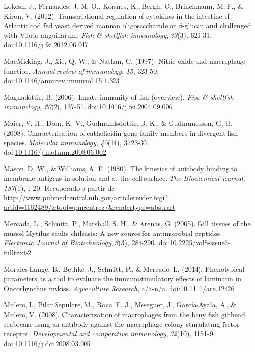 \documentclass[12pt,letterpaper,oneside]{scrbook}
\begin{document}
Lokesh, J., Fernandes, J. M. O., Korsnes, K., Bergh, O., Brinchmann, M.
F., \& Kiron, V. (2012). Transcriptional regulation of cytokines in the
intestine of Atlantic cod fed yeast derived mannan oligosaccharide or
\(\beta\)-glucan and challenged with Vibrio anguillarum. \emph{Fish \&
shellfish immunology}, \emph{33}(3), 626-31.
doi:\href{http://dx.doi.org/10.1016/j.fsi.2012.06.017}{10.1016/j.fsi.2012.06.017}

MacMicking, J., Xie, Q. W., \& Nathan, C. (1997). Nitric oxide and
macrophage function. \emph{Annual review of immunology}, \emph{15},
323-50.
doi:\href{http://dx.doi.org/10.1146/annurev.immunol.15.1.323}{10.1146/annurev.immunol.15.1.323}

Magnadóttir, B. (2006). Innate immunity of fish (overview). \emph{Fish
\& shellfish immunology}, \emph{20}(2), 137-51.
doi:\href{http://dx.doi.org/10.1016/j.fsi.2004.09.006}{10.1016/j.fsi.2004.09.006}

Maier, V. H., Dorn, K. V., Gudmundsdottir, B. K., \& Gudmundsson, G. H.
(2008). Characterisation of cathelicidin gene family members in
divergent fish species. \emph{Molecular immunology}, \emph{45}(14),
3723-30.
doi:\href{http://dx.doi.org/10.1016/j.molimm.2008.06.002}{10.1016/j.molimm.2008.06.002}

Mason, D. W., \& Williams, A. F. (1980). The kinetics of antibody
binding to membrane antigens in solution and at the cell surface.
\emph{The Biochemical journal}, \emph{187}(1), 1-20. Recuperado a partir
de
\url{http://www.pubmedcentral.nih.gov/articlerender.fcgi?artid=1162489/\&tool=pmcentrez/\&rendertype=abstract}

Mercado, L., Schmitt, P., Marshall, S. H., \& Arenas, G. (2005). Gill
tissues of the mussel Mytilus edulis chilensis: A new source for
antimicrobial peptides. \emph{Electronic Journal of Biotechnology},
\emph{8}(3), 284-290.
doi:\href{http://dx.doi.org/10.2225/vol8-issue3-fulltext-2}{10.2225/vol8-issue3-fulltext-2}

Morales-Lange, B., Bethke, J., Schmitt, P., \& Mercado, L. (2014).
Phenotypical parameters as a tool to evaluate the immunostimulatory
effects of laminarin in Oncorhynchus mykiss. \emph{Aquaculture
Research}, n/a-n/a.
doi:\href{http://dx.doi.org/10.1111/are.12426}{10.1111/are.12426}

Mulero, I., {Pilar Sepulcre}, M., Roca, F. J., Meseguer, J.,
García-Ayala, A., \& Mulero, V. (2008). Characterization of macrophages
from the bony fish gilthead seabream using an antibody against the
macrophage colony-stimulating factor receptor. \emph{Developmental and
comparative immunology}, \emph{32}(10), 1151-9.
doi:\href{http://dx.doi.org/10.1016/j.dci.2008.03.005}{10.1016/j.dci.2008.03.005}
\end{document}
